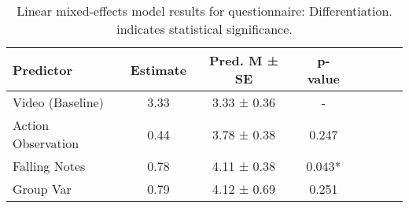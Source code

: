 
    \begin{table}[H]
    \centering
    \begin{small}
    \begin{tabular}{lccccccc}
\toprule
Predictor & Estimate & Pred. M ± SE & p-value \\
\midrule
Video (Baseline) & 3.33 & 3.33 ± 0.36 & - \\
Action Observation & 0.44 & 3.78 ± 0.38 & 0.247 \\
Falling Notes & 0.78 & 4.11 ± 0.38 & 0.043* \\
Group Var & 0.79 & 4.12 ± 0.69 & 0.251 \\
\bottomrule
\end{tabular}

    \end{small}
    \caption[Linear mixed-effects model results for questionnaire: Note Differentiation]{Linear mixed-effects model results for questionnaire: Differentiation. \newline * indicates statistical significance.}
    \label{tab:differentiation}
    \end{table}